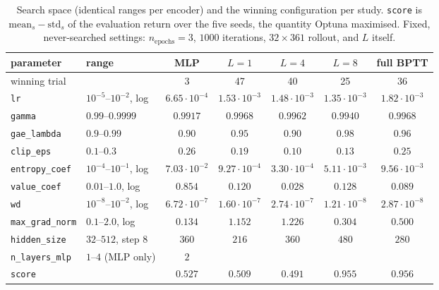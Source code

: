 \documentclass{article}
\begin{document}
\begin{table}[h]
    \centering
    \caption{Search space (identical ranges per encoder) and the winning
    configuration per study. \texttt{score} is $\mathrm{mean}_s -
    \mathrm{std}_s$ of the evaluation return over the five seeds, the quantity
    Optuna maximised. Fixed, never-searched settings: $n_{\text{epochs}}=3$,
    $1000$ iterations, $32 \times 361$ rollout, and $L$ itself.}
    \label{tab:params}
    \small
    \begin{tabular}{llccccc}
        \toprule
        parameter & range & MLP & $L{=}1$ & $L{=}4$ & $L{=}8$ & full BPTT \\
        \midrule
        winning trial & & 3 & 47 & 40 & 25 & 36 \\
        \texttt{lr} & $10^{-5}$--$10^{-2}$, log & $6.65\!\cdot\!10^{-4}$ & $1.53\!\cdot\!10^{-3}$ & $1.48\!\cdot\!10^{-3}$ & $1.35\!\cdot\!10^{-3}$ & $1.82\!\cdot\!10^{-3}$ \\
        \texttt{gamma} & $0.99$--$0.9999$ & $0.9917$ & $0.9968$ & $0.9962$ & $0.9940$ & $0.9968$ \\
        \texttt{gae\_lambda} & $0.9$--$0.99$ & $0.90$ & $0.95$ & $0.90$ & $0.98$ & $0.96$ \\
        \texttt{clip\_eps} & $0.1$--$0.3$ & $0.26$ & $0.19$ & $0.10$ & $0.13$ & $0.25$ \\
        \texttt{entropy\_coef} & $10^{-4}$--$10^{-1}$, log & $7.03\!\cdot\!10^{-2}$ & $9.27\!\cdot\!10^{-4}$ & $3.30\!\cdot\!10^{-4}$ & $5.11\!\cdot\!10^{-3}$ & $9.56\!\cdot\!10^{-3}$ \\
        \texttt{value\_coef} & $0.01$--$1.0$, log & $0.854$ & $0.120$ & $0.028$ & $0.128$ & $0.089$ \\
        \texttt{wd} & $10^{-8}$--$10^{-2}$, log & $6.72\!\cdot\!10^{-7}$ & $1.60\!\cdot\!10^{-7}$ & $2.74\!\cdot\!10^{-7}$ & $1.21\!\cdot\!10^{-8}$ & $2.87\!\cdot\!10^{-8}$ \\
        \texttt{max\_grad\_norm} & $0.1$--$2.0$, log & $0.134$ & $1.152$ & $1.226$ & $0.304$ & $0.500$ \\
        \texttt{hidden\_size} & $32$--$512$, step $8$ & $360$ & $216$ & $360$ & $480$ & $280$ \\
        \texttt{n\_layers\_mlp} & $1$--$4$ (MLP only) & $2$ & & & & \\
        \midrule
        \texttt{score} & & $0.527$ & $0.509$ & $0.491$ & $0.955$ & $\mathbf{0.956}$ \\
        \bottomrule
    \end{tabular}
\end{table}
\end{document}
